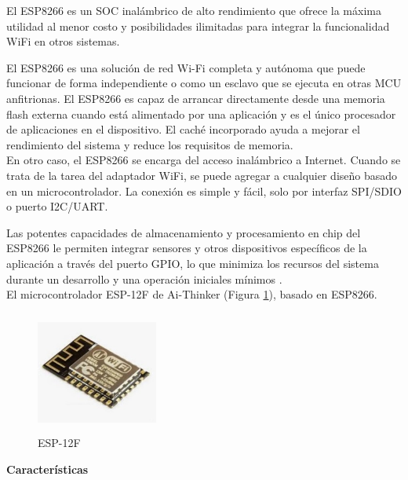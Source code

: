     El ESP8266 es un SOC inalámbrico de alto rendimiento que ofrece la máxima utilidad al menor costo y posibilidades ilimitadas para integrar la funcionalidad WiFi en otros sistemas.
    
    El ESP8266 es una solución de red Wi-Fi completa y autónoma que puede funcionar de forma independiente o como un esclavo que se ejecuta en otras MCU anfitrionas. El ESP8266 es capaz de arrancar directamente desde una memoria flash externa cuando está alimentado por una aplicación y es el único procesador de aplicaciones en el dispositivo. El caché incorporado ayuda a mejorar el rendimiento del sistema y reduce los requisitos de memoria.\\

    En otro caso, el ESP8266 se encarga del acceso inalámbrico a Internet. Cuando se trata de la tarea del adaptador WiFi, se puede agregar a cualquier diseño basado en un microcontrolador. La conexión es simple y fácil, solo por interfaz SPI/SDIO o puerto I2C/UART.

    Las potentes capacidades de almacenamiento y procesamiento en chip del ESP8266 le permiten integrar sensores y otros dispositivos específicos de la aplicación a través del puerto GPIO, lo que minimiza los recursos del sistema durante un desarrollo y una operación iniciales mínimos \cite{esp12}.\\

    El microcontrolador ESP-12F de Ai-Thinker (Figura \ref{imag:esp-12F}), basado en ESP8266.

    \begin{figure}[H]
        \centering
        \includegraphics[width=4cm, height=4cm]{imagenes/esp-12F.jpeg}
        \caption{ESP-12F}
        \label{imag:esp-12F}
    \end{figure}

    \textbf{Características}

